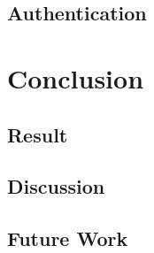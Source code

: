 \documentclass{article}
\begin{document}
    \subsection{Authentication}

\pagebreak

\section{Conclusion} 

    \subsection{Result}

    \subsection{Discussion}

    \subsection{Future Work}


\pagebreak



\pagebreak

\end{document}
